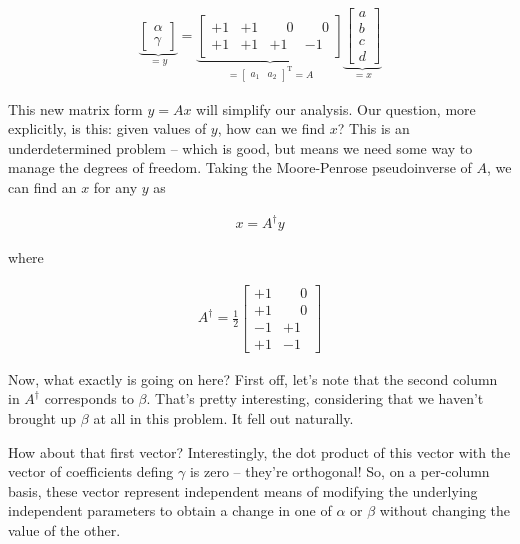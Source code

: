 \documentclass{article}
\begin{document}
\begin{align}
\underbrace{\begin{bmatrix} \alpha \\ \gamma \end{bmatrix}}_{=y}
= \underbrace{\begin{bmatrix} +1 & +1 & \phantom{\pm}0 & \phantom{\pm}0 \\ +1 & +1 & +1 & -1 \end{bmatrix}}_{=\begin{bmatrix}a_1 & a_2\end{bmatrix}^\text{T} = A}
\underbrace{\begin{bmatrix} a \\ b \\ c \\ d \end{bmatrix}}_{=x}
\end{align}

This new matrix form \(y = A x\) will simplify our analysis.  Our question, more explicitly, is this: given values of \(y\), how can we find \(x\)?  This is an underdetermined problem -- which is good, but means we need some way to manage the degrees of freedom.  Taking the Moore-Penrose pseudoinverse of \(A\), we can find an \(x\) for any \(y\) as

\begin{align}
x = A^\dagger y
\end{align}

where

\begin{align}
A^\dagger = \frac{1}{2} \begin{bmatrix}
+1 & \phantom{\pm}0 \\
+1 & \phantom{\pm}0 \\
-1 & +1 \\
+1 & -1
\end{bmatrix}
\end{align}

Now, what exactly is going on here?  First off, let's note that the second column in \(A^\dagger\) corresponds to \(\beta\).  That's pretty interesting, considering that we haven't brought up \(\beta\) at all in this problem.  It fell out naturally.

How about that first vector?  Interestingly, the dot product of this vector with the vector of coefficients defing \(\gamma\) is zero -- they're orthogonal!  So, on a per-column basis, these vector represent independent means of modifying the underlying independent parameters to obtain a change in one of \(\alpha\) or \(\beta\) without changing the value of the other.
\end{document}

